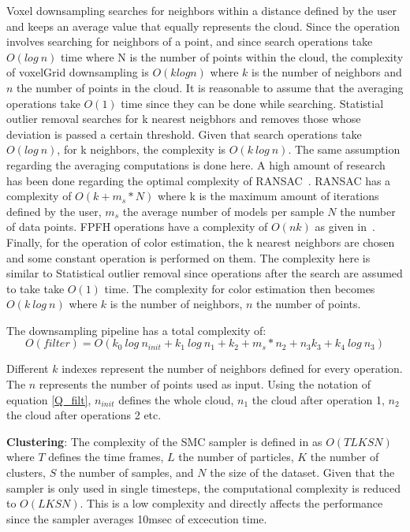 \documentclass[twoside,hidelinks]{article}
\begin{document}
Voxel downsampling searches for neighbors within a distance defined by the user and keeps an average value that equally represents the cloud. Since the operation involves searching for neighbors of a point, and since search operations take $O(log\ n)$ time where N is the number of points within the cloud, the complexity of voxelGrid downsampling is $O(k log n)$ where $k$ is the number of neighbors and $n$ the number of points in the cloud. It is reasonable to assume that the averaging operations take $O(1)$ time since they can be done while searching.
Statistial outlier removal searches for k nearest neigbhors and removes those whose deviation is passed a certain threshold. Given that search operations take $O(log\ n)$, for k neighbors, the complexity is $O(k\ log\ n)$. The same assumption regarding the averaging computations is done here.
A high amount of research has been done regarding the optimal complexity of RANSAC~\cite{RANSAC}. RANSAC has a complexity of $ O(k+ m_s*N)$ where k is the maximum amount of iterations defined by the user, $m_s$ the average number of models per sample $N$ the number of data points.
FPFH operations have a complexity of $O(nk)$ as given in~\cite{fpfh}.
Finally, for the operation of color estimation, the k nearest neighbors are chosen and some constant operation is performed on them. The complexity here is similar to Statistical outlier removal since operations after the search are assumed to take take $O(1)$ time. The complexity for color estimation then becomes $O(k\ log\ n)$ where $k$ is the number of neighbors, $n$ the number of points. 

The downsampling pipeline has a total complexity of:
\begin{equation} \label{Q_filt}
O(filter) = O(k_{0}\ log\ n_{init} + k_{1}\ log\ n_{1} + k_{2}+ m_s*n_{2} + n_{3}k_{3} + k_{4}\ log\ n_{3} )
\end{equation}

Different $k$ indexes represent the number of neighbors defined for every operation. The $n$ represents the number of points used as input. Using the notation  of equation \ref{Q_filt}, $n_{init}$ defines the whole cloud, $n_1$ the cloud after operation 1, $n_2$ the cloud after operations 2 etc.

\textbf{Clustering}: The complexity of the SMC sampler is defined in \cite{smcddp} as $O(TLKSN)$ where $T$ defines the time frames, $L$ the number of particles, $K$ the number of clusters, $S$ the number of samples, and $N$ the size of the dataset. Given that the sampler is only used in single timesteps, the computational complexity is reduced to $ O(LKSN) $. This is a low complexity and directly affects the performance since the sampler averages 10msec of excecution time.
\end{document}
